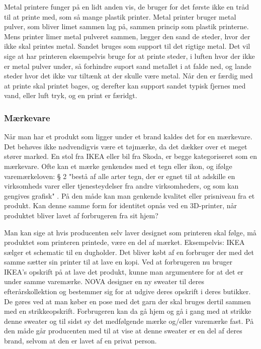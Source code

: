 Metal printere funger på en lidt anden vis, de bruger for det første ikke en tråd til at printe med, som så mange plastik printer. Metal printer bruger metal pulver, som bliver limet sammen lag på, sammen princip som plastik printerne. 
Mens printer limer metal pulveret sammen, lægger den sand de steder, hvor der ikke skal printes metal. Sandet bruges som support til det rigtige metal. Det vil sige at har printeren eksempelvis bruge for at printe steder, i luften hvor der ikke er metal pulver under, så forhindre suport sand metallet i at falde ned, og lande steder hvor det ikke var tiltænk at der skulle være metal.
Når den er færdig med at printe skal printet bages, og derefter kan support sandet typisk fjernes med vand, eller luft tryk, og en print er færidgt.

\subsubsection{Mærkevare}

Når man har et produkt som ligger under et brand kaldes det for en mærkevare. Det behøves ikke nødvendigvis være et tøjmærke, da det dækker over et meget stører marked.  En stol fra IKEA eller bil fra Skoda, er begge kategoriseret som en mærkevare.  
Ofte kan et mærke genkendes med et tegn eller ikon, og ifølge varemærkeloven: § 2 "bestå af alle arter tegn, der er egnet til at adskille en virksomheds varer eller tjenesteydelser fra andre virksomheders, og som kan gengives grafisk" . På den måde kan man genkende kvalitet eller prisniveau fra et produkt.
Kan denne samme form for identitet opnås ved en 3D-printer, når produktet bliver lavet af forbrugeren fra sit hjem?

Man kan sige at hvis producenten selv laver designet som printeren skal følge, må produktet som printeren printede, være en del af mærket. Eksempelvis: IKEA sælger et schematic til en dugholder. Det bliver købt af en forbruger der med det samme sætter sin printer til at lave en kopi. Ved at forbrugeren nu bruger IKEA’s opskrift på at lave det produkt, kunne man argumentere for at det er under samme varemærke. NOVA designer en ny sweater til deres efterårskollektion og bestemmer sig for at udgive deres opskrift i deres butikker. De gøres ved at man køber en pose med det garn der skal bruges dertil sammen med en strikkeopskrift. Forbrugeren kan da gå hjem og gå i gang med at strikke denne sweater og til sidst sy det medfølgende mærke og/eller varemærke fast. På den måde går producenten med til at vise at denne sweater er en del af deres brand, selvom at den er lavet af en privat person. 

